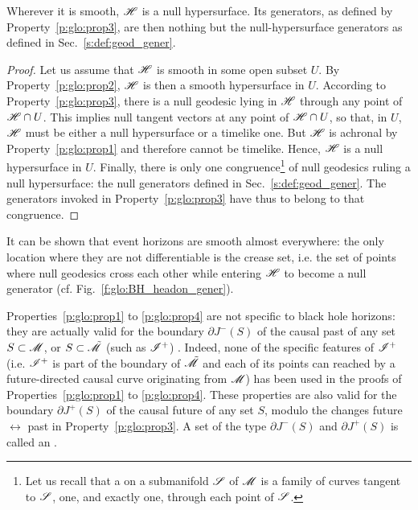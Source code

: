 \begin{prop}
\label{p:glo:prop4}
Wherever it is smooth, $\mathscr{H}$ is a null hypersurface.
Its generators,
as defined by Property~\ref{p:glo:prop3}, are then nothing but the
null-hypersurface generators as defined in Sec.~\ref{s:def:geod_gener}.
\end{prop}

\begin{proof}
Let us assume that $\mathscr{H}$ is smooth in some open subset $U$.
By Property~\ref{p:glo:prop2}, $\mathscr{H}$ is then a smooth hypersurface in $U$.
According to Property~\ref{p:glo:prop3}, there is a null geodesic lying in $\mathscr{H}$ through
any point of $\mathscr{H}\cap U$.
This implies null tangent vectors at any point of $\mathscr{H}\cap U$, so that, in $U$,
$\mathscr{H}$ must be either a null hypersurface or a timelike one. But $\mathscr{H}$ is achronal by Property~\ref{p:glo:prop1} and therefore cannot be timelike. Hence, $\mathscr{H}$ is a null hypersurface in $U$.
Finally, there is only one congruence\footnote{Let us recall that a  on a
submanifold $\mathscr{S}$ of $\mathscr{M}$ is a family of curves tangent to $\mathscr{S}$, one, and exactly one, through
each point of $\mathscr{S}$.} of null geodesics ruling a null hypersurface: the
null generators defined in Sec.~\ref{s:def:geod_gener}. The generators invoked in
Property~\ref{p:glo:prop3} have thus to belong to that congruence.
\end{proof}

It can be shown that event horizons are smooth almost everywhere: the only
location where they are not differentiable is the crease set, i.e. the set of points
where null geodesics cross each other while entering $\mathscr{H}$ to become a null
generator (cf. Fig.~\ref{f:glo:BH_headon_gener}).

\begin{remark}
\label{r:glo:achronal_boundaries}
Properties~\ref{p:glo:prop1} to \ref{p:glo:prop4} are not specific to black hole horizons: they are actually
valid for the boundary $\partial J^-(S)$ of the causal past of any set $S\subset\mathscr{M}$,
or $S\subset\tilde{\mathscr{M}}$ (such as $\mathscr{I}^+$) \cite{Penro68,HawkiE73,Gallo04,ONeil83}. Indeed, none of the
specific features of $\mathscr{I}^+$ (i.e. $\mathscr{I}^+$ is part of the boundary of $\tilde{\mathscr{M}}$ and
each of its points can reached by a future-directed causal curve originating from $\mathscr{M}$)
has been used in the proofs of
Properties~\ref{p:glo:prop1} to \ref{p:glo:prop4}.
These properties are also valid for the boundary $\partial J^+(S)$ of the causal future of any
set $S$, modulo the changes future $\leftrightarrow$ past in Property~\ref{p:glo:prop3}.
A set of the type $\partial J^-(S)$ and $\partial J^+(S)$ is called an
\cite{HawkiE73}.
\end{remark}



